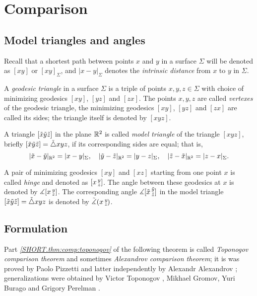 \chapter{Comparison}

\section*{Model triangles and angles}

Recall that a shortest path between points $x$ and $y$ in a surface $\Sigma$ will be denoted as $[xy]$ or $[xy]_\Sigma$, and
$|x-y|_\Sigma$ denotes the \emph{intrinsic distance} from $x$ to $y$ in $\Sigma$.

A \emph{geodesic triangle} in a surface $\Sigma$ is a triple of points $x,y,z\in \Sigma$ with choice of minimizing geodesics $[xy]$, $[yz]$ and $[zx]$.
The points $x,y,z$ are called \emph{vertexes} of the geodesic triangle,
the minimizing geodesics $[xy]$, $[yz]$ and $[zx]$ are called its sides;
the triangle itself is denoted by $[xyz]$.

A triangle $[\~x\~y\~z]$ in the plane $\RR^2$ is called \emph{model triangle} of the triangle $[xyz]$,
briefly $[\~x\~y\~z]=\~\triangle xyz$, if its corresponding sides are equal;
that is,
\[|\~x-\~y|_{\RR^2}=|x-y|_\Sigma,
\quad
|\~y-\~z|_{\RR^2}=|y-z|_\Sigma,
\quad
|\~z-\~x|_{\RR^2}=|z-x|_\Sigma.
\]

A pair of minimizing geodesics $[xy]$ and $[xz]$ starting from one point $x$ is called \emph{hinge} and denoted as $\hinge xyz$.
The angle between these geodesics at $x$ is denoted by $\measuredangle\hinge xyz$.
The corresponding angle $\measuredangle\hinge {\~x}{\~y}{\~z}$ in the model triangle $[\~x\~y\~z]=\~\triangle xyz$ is denoted by $\angk xyz$.

\section*{Formulation}

Part \textit{\ref{SHORT.thm:comp:toponogov}} of the following theorem is called \emph{Toponogov comparison theorem} and sometimes \emph{Alexandrov comparison theorem};
it is was proved by Paolo Pizzetti \cite{pizzetti} and latter independently by Alexandr Alexandrov \cite{alexandrov}; 
generalizations were obtained by  Victor Toponogov \cite{toponogov}, Mikhael Gromov, Yuri Burago and Grigory Perelman \cite{BGP}.

